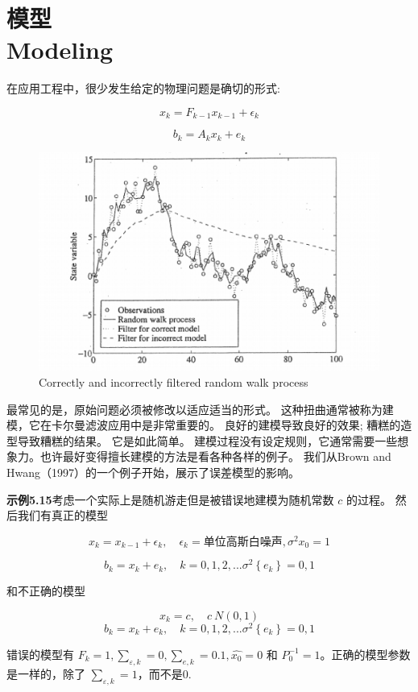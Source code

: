 \section[模型]{模型\\Modeling}

在应用工程中，很少发生给定的物理问题是确切的形式:


\[ x_{k}=F_{k-1}x_{k-1}+\epsilon_{k} \]

\[ b_{k}=A_{k}x_{k}+e_{k} \]

\begin{figure}[h]
	\centering
	\includegraphics[width=0.7\linewidth]{TeX_files/Part02/chapter05/image/3}
	\caption{Correctly and incorrectly filtered random walk process}
\end{figure}

最常见的是，原始问题必须被修改以适应适当的形式。 这种扭曲通常被称为建模，它在卡尔曼滤波应用中是非常重要的。 良好的建模导致良好的效果; 糟糕的造型导致糟糕的结果。 它是如此简单。 建模过程没有设定规则，它通常需要一些想象力。也许最好变得擅长建模的方法是看各种各样的例子。 我们从Brown and Hwang（1997）的一个例子开始，展示了误差模型的影响。

\textbf{示例5.15}考虑一个实际上是随机游走但是被错误地建模为随机常数 $ c $ 的过程。 然后我们有真正的模型

\[ x_{k}=x_{k-1}+\epsilon_{k}, \quad \epsilon_{k}=单位高斯白噪声,\sigma^{2}{x_{0}}=1 \]

\[ b_{k}=x_{k}+e_{k},\quad k=0,1,2,...\sigma^{2}\left\lbrace e_{k}\right\rbrace =0,1\]

和不正确的模型

\[ x_{k}=c,\quad c~N(0,1) \]
\[ b_{k}=x_{k}+e_{k},\quad k=0,1,2,...\sigma^{2}\left\lbrace e_{k}\right\rbrace=0,1 \]

错误的模型有 $ F_{k}=1,\sum\nolimits_{\varepsilon,k}=0,\sum\nolimits_{e,k}=0.1, \hat{x_{0}}=0 $ 和 $ P_{0}^{-1}=1 $。正确的模型参数是一样的，除了 $ \sum\nolimits_{\varepsilon,k}=1 $，而不是0.


